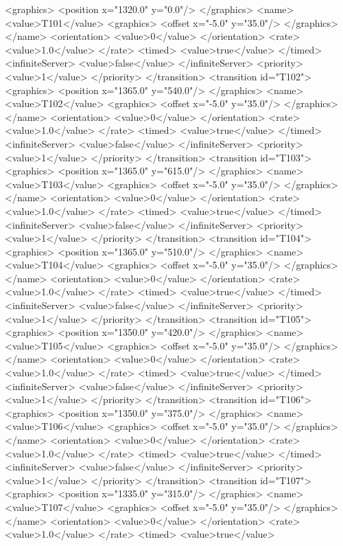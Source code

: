 <graphics>
<position x="1320.0" y="0.0"/>
</graphics>
<name>
<value>T101</value>
<graphics>
<offset x="-5.0" y="35.0"/>
</graphics>
</name>
<orientation>
<value>0</value>
</orientation>
<rate>
<value>1.0</value>
</rate>
<timed>
<value>true</value>
</timed>
<infiniteServer>
<value>false</value>
</infiniteServer>
<priority>
<value>1</value>
</priority>
</transition>
<transition id="T102">
<graphics>
<position x="1365.0" y="540.0"/>
</graphics>
<name>
<value>T102</value>
<graphics>
<offset x="-5.0" y="35.0"/>
</graphics>
</name>
<orientation>
<value>0</value>
</orientation>
<rate>
<value>1.0</value>
</rate>
<timed>
<value>true</value>
</timed>
<infiniteServer>
<value>false</value>
</infiniteServer>
<priority>
<value>1</value>
</priority>
</transition>
<transition id="T103">
<graphics>
<position x="1365.0" y="615.0"/>
</graphics>
<name>
<value>T103</value>
<graphics>
<offset x="-5.0" y="35.0"/>
</graphics>
</name>
<orientation>
<value>0</value>
</orientation>
<rate>
<value>1.0</value>
</rate>
<timed>
<value>true</value>
</timed>
<infiniteServer>
<value>false</value>
</infiniteServer>
<priority>
<value>1</value>
</priority>
</transition>
<transition id="T104">
<graphics>
<position x="1365.0" y="510.0"/>
</graphics>
<name>
<value>T104</value>
<graphics>
<offset x="-5.0" y="35.0"/>
</graphics>
</name>
<orientation>
<value>0</value>
</orientation>
<rate>
<value>1.0</value>
</rate>
<timed>
<value>true</value>
</timed>
<infiniteServer>
<value>false</value>
</infiniteServer>
<priority>
<value>1</value>
</priority>
</transition>
<transition id="T105">
<graphics>
<position x="1350.0" y="420.0"/>
</graphics>
<name>
<value>T105</value>
<graphics>
<offset x="-5.0" y="35.0"/>
</graphics>
</name>
<orientation>
<value>0</value>
</orientation>
<rate>
<value>1.0</value>
</rate>
<timed>
<value>true</value>
</timed>
<infiniteServer>
<value>false</value>
</infiniteServer>
<priority>
<value>1</value>
</priority>
</transition>
<transition id="T106">
<graphics>
<position x="1350.0" y="375.0"/>
</graphics>
<name>
<value>T106</value>
<graphics>
<offset x="-5.0" y="35.0"/>
</graphics>
</name>
<orientation>
<value>0</value>
</orientation>
<rate>
<value>1.0</value>
</rate>
<timed>
<value>true</value>
</timed>
<infiniteServer>
<value>false</value>
</infiniteServer>
<priority>
<value>1</value>
</priority>
</transition>
<transition id="T107">
<graphics>
<position x="1335.0" y="315.0"/>
</graphics>
<name>
<value>T107</value>
<graphics>
<offset x="-5.0" y="35.0"/>
</graphics>
</name>
<orientation>
<value>0</value>
</orientation>
<rate>
<value>1.0</value>
</rate>
<timed>
<value>true</value>
